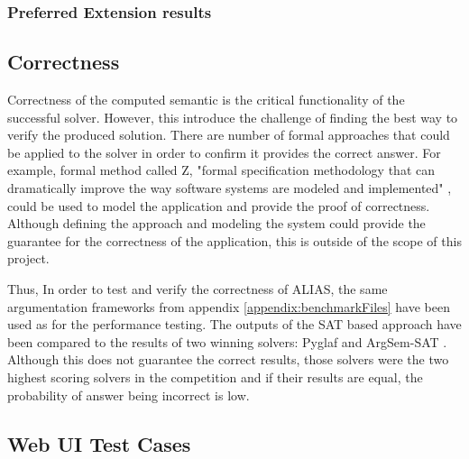 \subsubsection{Preferred Extension results}

\subsection{Correctness}
Correctness of the computed semantic is the critical functionality of the successful solver. However, this introduce the challenge of finding the best way to verify the produced solution. There are number of formal approaches that could be applied to the solver in order to confirm it provides the correct answer. For example, formal method called Z, "formal specification methodology that can dramatically improve the way software systems are modeled and implemented" \citep{potter1996introduction}, could be used to model the application and provide the proof of correctness. Although defining the approach and modeling the system could provide the guarantee for the correctness of the application, this is outside of the scope of this project. 

Thus, In order to test and verify the correctness of ALIAS, the same argumentation frameworks from appendix \ref{appendix:benchmarkFiles} have been used as for the performance testing. The outputs of the SAT based approach have been compared to the results of two winning solvers: Pyglaf \citep{pyglaf} and ArgSem-SAT \citep{argsemsat}. Although this does not guarantee the correct results, those solvers were the two highest scoring solvers in the competition and if their results are equal, the probability of answer being incorrect is low.

\subsection{Web UI Test Cases}
